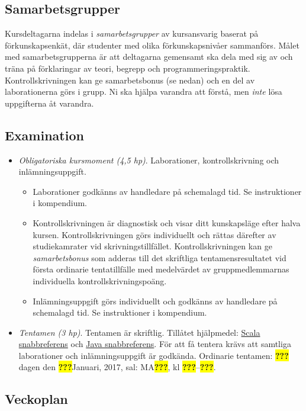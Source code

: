 \documentclass[a4paper,12pt,oneside]{memoir}
\newcommand{\TBD}{\colorbox{yellow}{\textbf{???}}}
\begin{document}
\subsection{Samarbetsgrupper}\label{samarbetsgrupper}

Kursdeltagarna indelas i \emph{samarbetsgrupper} av kursansvarig baserat
på förkunskapsenkät, där studenter med olika förkunskapsnivåer
sammanförs. Målet med samarbetsgrupperna är att deltagarna gemensamt ska
dela med sig av och träna på förklaringar av teori, begrepp och
programmeringspraktik. Kontrollskrivningen kan ge samarbetsbonus (se
nedan) och en del av laborationerna görs i grupp. Ni ska hjälpa varandra att
förstå, men \emph{inte} lösa uppgifterna åt varandra.

\subsection{Examination}\label{examination}

\begin{itemize}
\item
  \emph{Obligatoriska kursmoment (4,5 hp)}. Laborationer,
  kontrollskrivning och inlämningsuppgift.

  \begin{itemize}
  \item
    Laborationer godkänns av handledare på schemalagd tid. Se
    instruktioner i kompendium.
  \item
    Kontrollskrivningen är diagnostisk och visar ditt kunskapsläge efter
    halva kursen. Kontrollskrivningen görs individuellt och rättas
    därefter av studiekamrater vid skrivningstillfället.
    Kontrollskrivningen kan ge \emph{samarbetsbonus} som adderas till
    det skriftliga tentamensresultatet vid första ordinarie
    tentatillfälle med medelvärdet av gruppmedlemmarnas individuella
    kontrollskrivningspoäng.
  \item
    Inlämningsuppgift görs individuellt och godkänns av handledare på
    schemalagd tid. Se instruktioner i kompendium.
  \end{itemize}

\item
  \emph{Tentamen (3 hp)}. Tentamen är skriftlig. Tillåtet hjälpmedel:
  \href{http://cs.lth.se/eda016/scalaref}{Scala snabbreferens} och 
  \href{http://cs.lth.se/eda016/javaref}{Java snabbreferens}. 
  För att få tentera krävs att samtliga laborationer och inlämningsuppgift är godkända.
   Ordinarie tentamen: \TBD dagen den \TBD Januari, 2017, sal: MA\TBD, kl \TBD--\TBD.
\end{itemize}

\clearpage

\subsection*{Veckoplan}

{\fontsize{12pt}{18pt}\selectfont 

}
\end{document}
